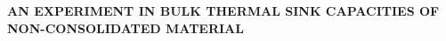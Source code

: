 \documentclass{beamer}
\begin{document}
\vspace{180mm}
\centering\textbf{AN EXPERIMENT IN BULK THERMAL SINK CAPACITIES OF NON-CONSOLIDATED MATERIAL\\}
\end{document}
